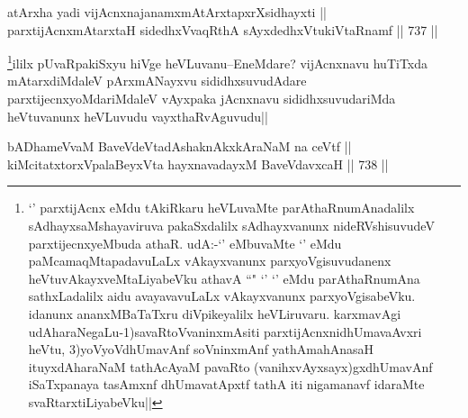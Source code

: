 
\begin{shl}
atArx\s \s ha yadi vijAcnxnajanamxmAtArxtapxrXsidhayxti || \\
parxtijAcnxmAtarxtaH sidedhxVvaqRthA sAyxdedhxVtukiVtaRnamf ||  737 ||  
\end{shl}

\begin{artha}
\footnote{`\stext' parxtijAcnx eMdu tAkiRkaru heVLuvaMte parAthaRnumAnadalilx sAdhayxsaMshayaviruva pakaSxdalilx sAdhayxvanunx nideRVshisuvudeV parxtijecnxyeMbuda athaR. udA:-`\stext' eMbuvaMte `\stext' eMdu paMcamaqMtapadavuLaLx vAkayxvanunx parxyoVgisuvudanenx heVtuvAkayxveMtaLiyabeVku athavA ``\stext" `\stext' `\stext' eMdu parAthaRnumAna sathxLadalilx aidu avayavavuLaLx vAkayxvanunx parxyoVgisabeVku. idanunx ananxMBaTaTxru diVpikeyalilx heVLiruvaru. karxmavAgi udAharaNegaLu-1)savaRtoVvaninxmAsiti parxtijAcnxnidhUmavaAvxri heVtu, 3)yoVyoVdhUmavAnf soV\s ninxmAnf yathAmahAnasaH ituyxdAharaNaM tathAcAyaM pavaRto (vanihxvAyxsayx)gxdhUmavAnf  iSaTxpanaya tasAmxnf dhUmavatApxtf tathA  iti nigamanavf idaraMte svaRtarxtiLiyabeVku||}ililx pUvaRpakiSxyu hiVge heVLuvanu--EneMdare? vijAcnxnavu huTiTxda mAtarxdiMdaleV pArxmANayxvu sididhxsuvudAdare parxtijecnxyoMdariMdaleV vAyxpaka jAcnxnavu sididhxsuvudariMda heVtuvanunx heVLuvudu vayxthaRvAguvudu||
\end{artha}


\begin{shl}
bADhameVvaM BaveVdeVtadAshaknAkxkAraNaM na ceVtf || \\
kiMcitatxtorxVpalaBeyxVta hayxnavadayxM BaveVdavxcaH ||  738 ||  
\end{shl}

